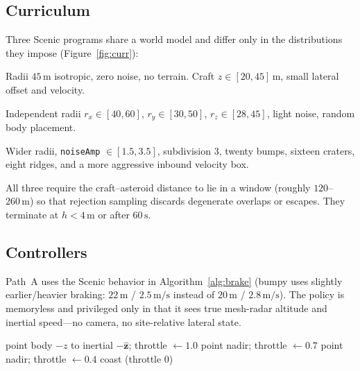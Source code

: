 \documentclass[10pt]{article}
\begin{document}
\subsection{Curriculum}

Three Scenic programs share a world model and differ only in the distributions they impose (Figure~\ref{fig:curr}):
\begin{description}[leftmargin=1.1em,style=nextline]
  \item[\texttt{sphere.scenic}]
    Radii $45\,\mathrm{m}$ isotropic, zero noise, no terrain.
    Craft $z \in [20,45]\,\mathrm{m}$, small lateral offset and velocity.
  \item[\texttt{ellipsoid.scenic}]
    Independent radii $r_x \in [40,60]$, $r_y \in [30,50]$, $r_z \in [28,45]$, light noise, random body placement.
  \item[\texttt{bumpy.scenic}]
    Wider radii, \texttt{noiseAmp} $\in [1.5, 3.5]$, subdivision 3, twenty bumps, sixteen craters, eight ridges, and a more aggressive inbound velocity box.
\end{description}
All three require the craft--asteroid distance to lie in a window (roughly $120$--$260\,\mathrm{m}$) so that rejection sampling discards degenerate overlaps or escapes.
They terminate at $h < 4\,\mathrm{m}$ or after $60\,\mathrm{s}$.

\subsection{Controllers}

Path~A uses the Scenic behavior in Algorithm~\ref{alg:brake} (bumpy uses slightly earlier/heavier braking: $22\,\mathrm{m}$ / $2.5\,\mathrm{m/s}$ instead of $20\,\mathrm{m}$ / $2.8\,\mathrm{m/s}$).
The policy is memoryless and privileged only in that it sees true mesh-radar altitude and inertial speed---no camera, no site-relative lateral state.

\begin{algorithm}[t]
\caption{Scripted soft-brake behavior (sphere / ellipsoid).}
\label{alg:brake}
\begin{algorithmic}[1]
\Repeat
    \State point body $-z$ to inertial $-\hat{\mathbf{z}}$; throttle $\leftarrow 1.0$
    \State point nadir; throttle $\leftarrow 0.7$
    \State point nadir; throttle $\leftarrow 0.4$
  \Else
    \State coast (throttle $0$)
  \EndIf
{}
\end{algorithmic}
\end{algorithm}
\end{document}
